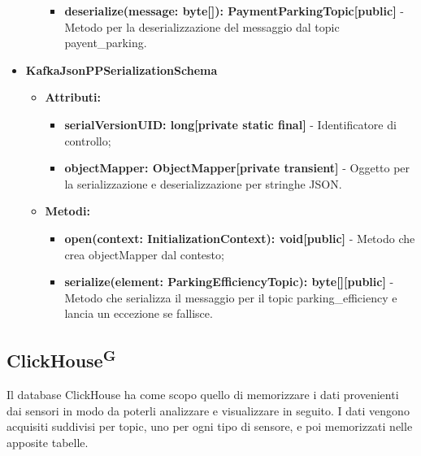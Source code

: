 \documentclass[8pt]{article}
\newcommand{\glossterm}[1]{#1\textsuperscript{G}} %
\begin{document}
\begin{itemize}
\begin{itemize}
\begin{itemize}
            \item \textbf{deserialize(message: byte[]): PaymentParkingTopic[public]} - Metodo per la deserializzazione del messaggio dal topic payent\_parking.
        \end{itemize}
    \end{itemize}
    \item \textbf{KafkaJsonPPSerializationSchema}
    \begin{itemize}
        \item \textbf{Attributi:}
        \begin{itemize}
            \item \textbf{serialVersionUID: long[private static final]} - Identificatore di controllo;
            \item \textbf{objectMapper: ObjectMapper[private transient]} - Oggetto per la serializzazione e deserializzazione per stringhe JSON.
        \end{itemize}
    \end{itemize}
    \begin{itemize}
        \item \textbf{Metodi:}
        \begin{itemize}
            \item \textbf{open(context: InitializationContext): void[public]} - Metodo che crea objectMapper dal contesto;
            \item \textbf{serialize(element: ParkingEfficiencyTopic): byte[][public]} - Metodo che serializza il messaggio per il topic parking\_efficiency e lancia un eccezione se fallisce.
        \end{itemize}
    \end{itemize}
\end{itemize}
\clearpage
\subsection{\glossterm{ClickHouse}}
Il database ClickHouse ha come scopo quello di memorizzare i dati provenienti dai sensori in modo da poterli analizzare e visualizzare in seguito. I dati vengono acquisiti suddivisi per topic, uno per ogni tipo di sensore, e poi memorizzati nelle apposite tabelle.
\end{document}
